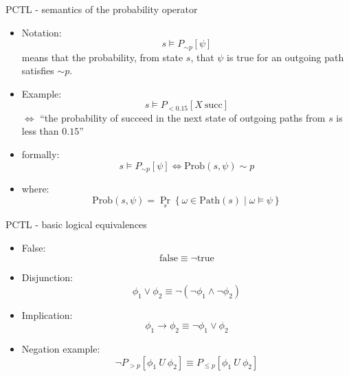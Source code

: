 \documentclass[dvipsnames]{beamer}
\begin{document}
\begin{frame}{PCTL - semantics of the probability operator}

    \begin{itemize}

        \item[] Notation:
              \[
                  s \models P_{\sim p}[\psi]
              \]
              means that the probability, from state $s$, that $\psi$ is true for an outgoing path satisfies $\sim p$.

              \vspace{1em}

        \item[] Example:
              \[
                  s \models P_{<0.15}[X\ \text{succ}]
              \]
              $\iff$
              ``the probability of succeed in the next state of outgoing paths from $s$ is less than $0.15$''

        \item[] formally:
              \[
                  s \models P_{\sim p}[\psi]
                  \iff
                  {\mathrm{Prob}(s,\psi)\sim p}
              \]
        \item[] where:
              \[
                  {\mathrm{Prob}(s,\psi)}
                  =
                  \Pr_s \left\{
                  \omega \in \mathrm{Path}(s)
                  \mid
                  \omega \models \psi
                  \right\}
              \]

    \end{itemize}

\end{frame}

\begin{frame}{PCTL - basic logical equivalences}

    \begin{itemize}
        \item[] False:
              \[
                  \text{false} \equiv \neg \text{true}
              \]

        \item[] Disjunction:
              \[
                  \phi_1 \lor \phi_2
                  \equiv
                  \neg(\neg \phi_1 \land \neg \phi_2)
              \]

        \item[] Implication:
              \[
                  \phi_1 \rightarrow \phi_2
                  \equiv
                  \neg \phi_1 \lor \phi_2
              \]
        \item[] Negation example:
              \[
                  \neg P_{>p}[\phi_1 \ U \ \phi_2]
                  \equiv
                  P_{\leq p}[\phi_1 \ U \ \phi_2]
              \]

    \end{itemize}

\end{frame}
\end{document}
